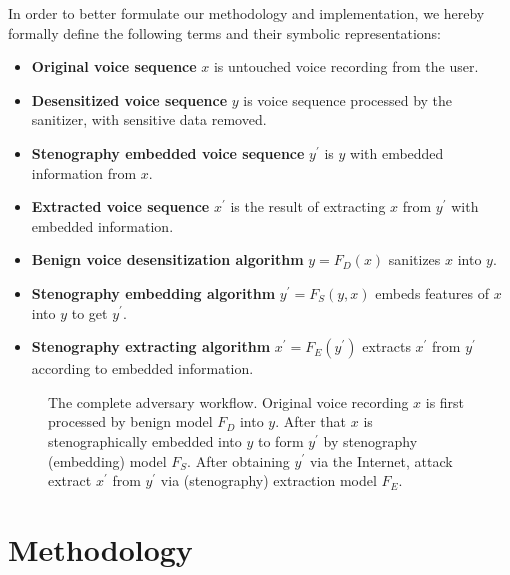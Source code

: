 \documentclass[conference]{IEEEtran}
\begin{document}
In order to better formulate our methodology and implementation, we hereby formally define the following terms and their symbolic representations:

\begin{itemize}
    \item \textbf{Original voice sequence} $x$ is untouched voice recording from the user.
    \item \textbf{Desensitized voice sequence} $y$ is voice sequence processed by the sanitizer, with sensitive data removed.
    \item \textbf{Stenography embedded voice sequence} $y^{\prime}$ is $y$ with embedded information from $x$.
    \item \textbf{Extracted voice sequence} $x^{\prime}$ is the result of extracting $x$ from $y^{\prime}$ with embedded information.
    \item \textbf{Benign voice desensitization algorithm} $y = F_D(x)$ sanitizes $x$ into $y$.
    \item \textbf{Stenography embedding algorithm} $y^{\prime} = F_S(y, x)$ embeds features of $x$ into $y$ to get $y^{\prime}$.
    \item \textbf{Stenography extracting algorithm} $x^{\prime} = F_E(y^{\prime})$ extracts $x^{\prime}$ from $y^{\prime}$ according to embedded information.
\end{itemize}

\begin{figure}[!t]
    \caption{The complete adversary workflow. Original voice recording $x$ is first processed by benign model $F_D$ into $y$. After that $x$ is stenographically embedded into $y$ to form $y^{\prime}$ by stenography (embedding) model $F_S$. After obtaining $y^{\prime}$ via the Internet, attack extract $x^{\prime}$ from $y^{\prime}$ via (stenography) extraction model $F_E$.}
    \label{fig:method}
\end{figure}

\section{Methodology}
\label{seg:method}
\end{document}
